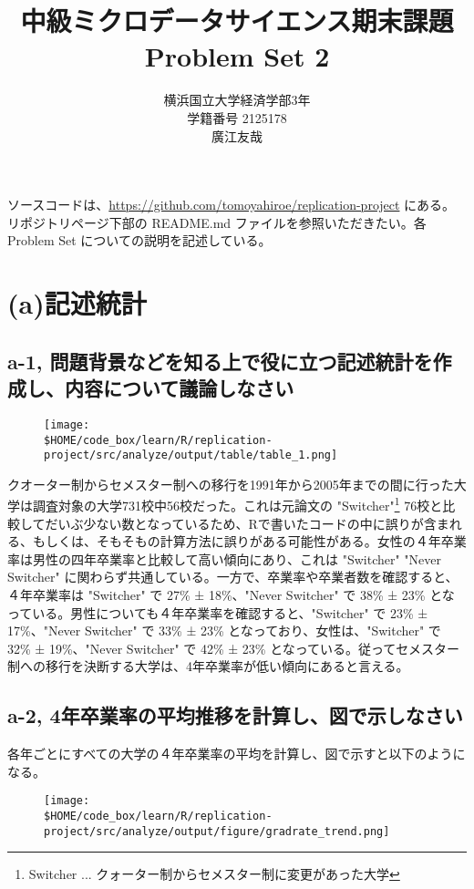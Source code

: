 \documentclass[a4paper]{jsarticle}
\title{中級ミクロデータサイエンス期末課題\\Problem Set 2}
\author{横浜国立大学経済学部3年\\学籍番号 2125178\\廣江友哉}
\begin{document}
\maketitle

ソースコードは、\url{https://github.com/tomoyahiroe/replication-project} にある。リポジトリページ下部の README.md ファイルを参照いただきたい。各Problem Set についての説明を記述している。

\section*{(a)記述統計}

\subsection*{a-1, 問題背景などを知る上で役に立つ記述統計を作成し、内容について議論しなさい}
\begin{figure}[h]
  \centering
  \texttt{[image: \\\$HOME/code\_box/learn/R/replication-project/src/analyze/output/table/table\_1.png]}

\end{figure}

クオーター制からセメスター制への移行を1991年から2005年までの間に行った大学は調査対象の大学731校中56校だった。これは元論文の "Switcher"\footnote{Switcher ... クォーター制からセメスター制に変更があった大学} 76校と比較してだいぶ少ない数となっているため、Rで書いたコードの中に誤りが含まれる、もしくは、そもそもの計算方法に誤りがある可能性がある。女性の４年卒業率は男性の四年卒業率と比較して高い傾向にあり、これは "Switcher" "Never Switcher" に関わらず共通している。一方で、卒業率や卒業者数を確認すると、４年卒業率は "Switcher" で 27\% ± 18\%、"Never Switcher" で 38\% ± 23\% となっている。男性についても４年卒業率を確認すると、"Switcher" で 23\% ± 17\%、"Never Switcher" で 33\% ± 23\% となっており、女性は、"Switcher" で 32\% ± 19\%、"Never Switcher" で 42\% ± 23\% となっている。従ってセメスター制への移行を決断する大学は、4年卒業率が低い傾向にあると言える。

\subsection*{a-2, 4年卒業率の平均推移を計算し、図で示しなさい}

各年ごとにすべての大学の４年卒業率の平均を計算し、図で示すと以下のようになる。

\begin{figure}[H]
  \centering
  \texttt{[image: \\\$HOME/code\_box/learn/R/replication-project/src/analyze/output/figure/gradrate\_trend.png]}

\end{figure}
\end{document}
